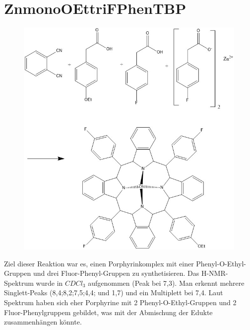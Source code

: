\section{ZnmonoOEttriFPhenTBP}
\begin{figure}[!htpb]
\centering
\includegraphics[scale=0.5]{graphics/Zn(ethoxyphenyl)tris(fluorophenyl)tetrakis(phenylpyrrol)porphyrin}
\end{figure}
Ziel dieser Reaktion war es, einen Porphyrinkomplex mit einer Phenyl-O-Ethyl-Gruppen und drei Fluor-Phenyl-Gruppen zu synthetisieren.  Das H-NMR-Spektrum wurde in $CDCl_3$ aufgenommen (Peak bei 7,3). Man erkennt mehrere Singlett-Peaks (8,4;8,2;7,5;4,4; und 1,7) und ein Multiplett bei 7,4. Laut Spektrum haben sich eher Porphyrine mit 2 Phenyl-O-Ethyl-Gruppen und 2 Fluor-Phenylgruppem gebildet, was mit der Abmischung der Edukte zusammenhängen könnte.

